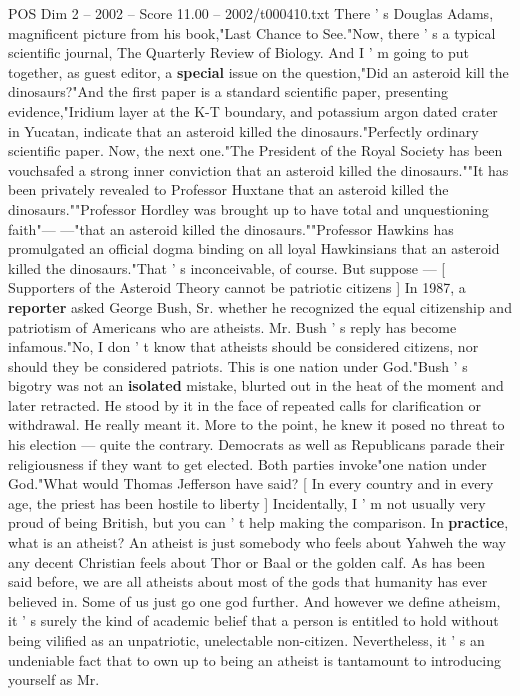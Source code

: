 \begin{textsample}{POS Dim 2 – 2002 – Score 11.00 – 2002/t000410.txt}
There ' s Douglas Adams, magnificent picture from his book,"Last Chance to See."Now, there ' s a typical scientific journal, The Quarterly Review of Biology.
And I ' m going to put together, as guest editor, a \textbf{special} issue on the question,"Did an asteroid kill the dinosaurs?"And the first paper is a standard scientific paper, presenting evidence,"Iridium layer at the K-T boundary, and potassium argon dated crater in Yucatan, indicate that an asteroid killed the dinosaurs."Perfectly ordinary scientific paper.
Now, the next one."The President of the Royal Society has been vouchsafed a strong inner conviction that an asteroid killed the dinosaurs.""It has been privately revealed to Professor Huxtane that an asteroid killed the dinosaurs.""Professor Hordley was brought up to have total and unquestioning faith"— —"that an asteroid killed the dinosaurs.""Professor Hawkins has promulgated an official dogma binding on all loyal Hawkinsians that an asteroid killed the dinosaurs."That ' s inconceivable, of course.
But suppose — [ Supporters of the Asteroid Theory cannot be patriotic citizens ] In 1987, a \textbf{reporter} asked George Bush, Sr. whether he recognized the equal citizenship and patriotism of Americans who are atheists.
Mr.
Bush ' s reply has become infamous."No, I don ' t know that atheists should be considered citizens, nor should they be considered patriots.
This is one nation under God."Bush ' s bigotry was not an \textbf{isolated} mistake, blurted out in the heat of the moment and later retracted.
He stood by it in the face of repeated calls for clarification or withdrawal.
He really meant it.
More to the point, he knew it posed no threat to his election — quite the contrary.
Democrats as well as Republicans parade their religiousness if they want to get elected.
Both parties invoke"one nation under God."What would Thomas Jefferson have said? [ In every country and in every age, the priest has been hostile to liberty ] Incidentally, I ' m not usually very proud of being British, but you can ' t help making the comparison.
In \textbf{practice}, what is an atheist?
An atheist is just somebody who feels about Yahweh the way any decent Christian feels about Thor or Baal or the golden calf.
As has been said before, we are all atheists about most of the gods that humanity has ever believed in.
Some of us just go one god further.
And however we define atheism, it ' s surely the kind of academic belief that a person is entitled to hold without being vilified as an unpatriotic, unelectable non-citizen.
Nevertheless, it ' s an undeniable fact that to own up to being an atheist is tantamount to introducing yourself as Mr.

\end{textsample}
